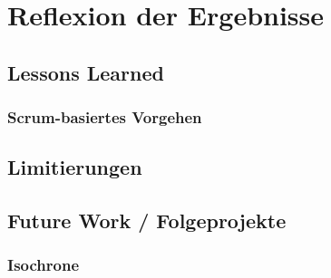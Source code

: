 \newpage
\section{Reflexion der Ergebnisse} \label{infos}

\subsection{Lessons Learned}
\subsubsection{Scrum-basiertes Vorgehen}

\subsection{Limitierungen}

\subsection{Future Work / Folgeprojekte}
\subsubsection{Isochrone}
